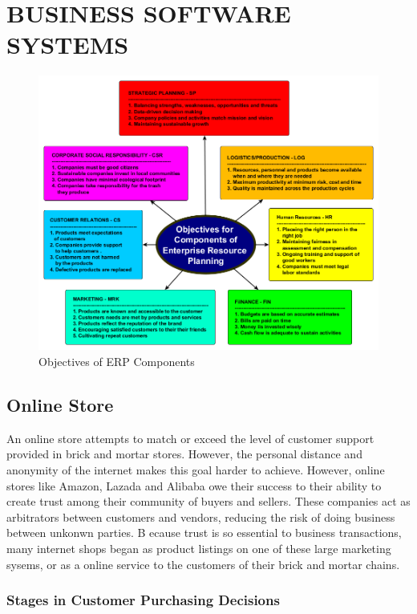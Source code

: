 \documentclass[]{book}
\begin{document}
\hypertarget{business-software-systems}{%
\chapter{BUSINESS SOFTWARE SYSTEMS}\label{business-software-systems}}

\begin{figure}
\centering
\includegraphics{images/ebusiness.png}
\caption{Objectives of ERP Components}
\end{figure}

\hypertarget{online-store}{%
\section{Online Store}\label{online-store}}

An online store attempts to match or exceed the level of customer support provided in brick and mortar stores. However, the personal distance and anonymity of the internet makes this goal harder to achieve. However, online stores like Amazon, Lazada and Alibaba owe their success to their ability to create trust among their community of buyers and sellers. These companies act as arbitrators between customers and vendors, reducing the risk of doing business between unkonwn parties. B ecause trust is so essential to business transactions, many internet shops began as product listings on one of these large marketing sysems, or as a online service to the customers of their brick and mortar chains.

\hypertarget{stages-in-customer-purchasing-decisions}{%
\subsection{Stages in Customer Purchasing Decisions}\label{stages-in-customer-purchasing-decisions}}
\end{document}
